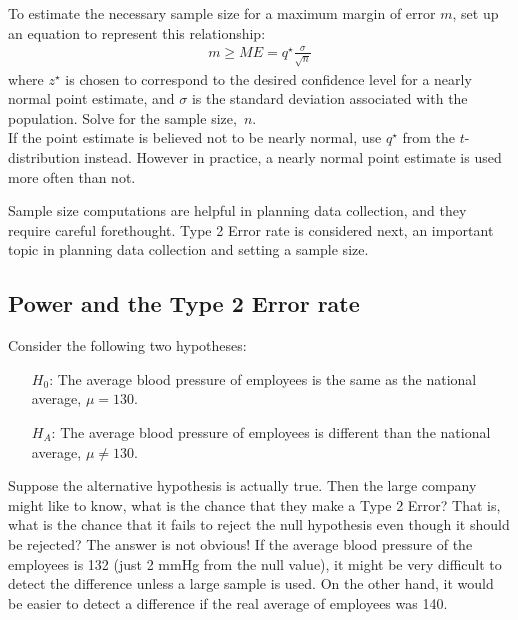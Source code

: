 \begin{termBox}{
To estimate the necessary sample size for a maximum margin of error $m$, set up an equation to represent this relationship:
\begin{align*}
m \geq ME = q^{\star}\frac{\sigma}{\sqrt{n}}
\end{align*}
where $z^{\star}$ is chosen to correspond to the desired confidence level for a nearly normal point estimate, and $\sigma$ is the standard deviation associated with the population. Solve for the sample size,~$n$.\\
If the point estimate is believed not to be nearly normal, use $q^{\star}$ from the $t$-distribution instead. However in practice, a nearly normal point estimate is used more often than not.}
\end{termBox}

Sample size computations are helpful in planning data collection, and they require careful forethought. Type 2 Error rate is considered next, an important topic in planning data collection and setting a sample size.



\subsection{Power and the Type 2 Error rate}
\label{powerType2}

Consider the following two hypotheses:
\begin{itemize}
\setlength{\itemsep}{0.5mm}
\item[$H_0$:] The average blood pressure of employees is the same as the national average, $\mu = 130$.
\item[$H_A$:] The average blood pressure of employees is different than the national average, $\mu \neq 130$.
\end{itemize}
Suppose the alternative hypothesis is actually true. Then the large company might like to know, what is the chance that they make a Type 2 Error? That is, what is the chance that it fails to reject the null hypothesis even though it should be rejected? The answer is not obvious! If the average blood pressure of the employees is 132 (just 2 mmHg from the null value), it might be very difficult to detect the difference unless a large sample is used. On the other hand, it would be easier to detect a difference if the real average of employees was 140.

